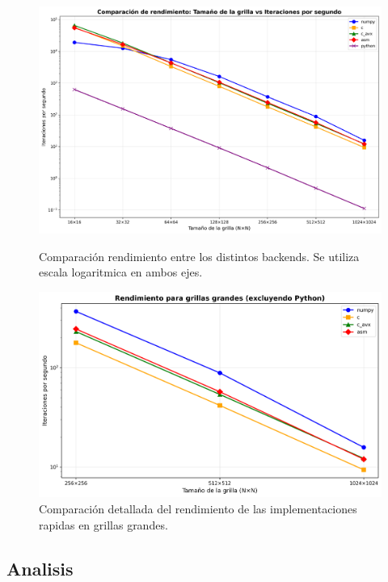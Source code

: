 \documentclass[a4paper]{article}
\begin{document}
\begin{figure}[H]
    \centering
    \begin{minipage}[t]{0.48\textwidth}
        \centering
        \includegraphics[width=\textwidth]{extra/steps_per_second.png}
        \caption{Comparación rendimiento entre los distintos backends. Se utiliza escala logaritmica en ambos ejes.}
        \label{fig:performance}
    \end{minipage}
    \hfill
    \begin{minipage}[t]{0.48\textwidth}
        \centering
        \includegraphics[width=\textwidth]{extra/steps_per_second_top3.png}
        \caption{Comparación detallada del rendimiento de las implementaciones rapidas en grillas grandes.}
        \label{fig:performance_top3}
    \end{minipage}
\end{figure}

\subsection{Analisis}
\end{document}
